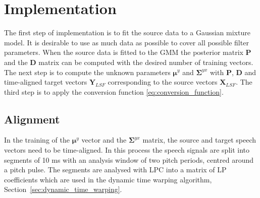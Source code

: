 \chapter{Implementation} %
\label{cha:implementation}
The first step of implementation is to fit the source data to a Gaussian mixture model. It is desirable to use as much data as possible to cover all possible filter parameters. When the source data is fitted to the GMM the posterior matrix $\mathbf{P}$ and the $\mathbf{D}$ matrix can be computed with the desired number of training vectors. The next step is to compute the unknown parameters $\boldsymbol{\mu}^y$ and $\mathbf{\Sigma}^{yx}$ with $\mathbf{P}$, $\mathbf{D}$ and time-aligned target vectors $\mathbf{Y}_{LSF}$ corresponding to the source vectors $\mathbf{X}_{LSF}$. The third step is to apply the conversion function \eqref{eq:conversion_function}.


\section{Alignment} %
\label{sec:alignment}
In the training of the $\boldsymbol{\mu}^y$ vector and the $\mathbf{\Sigma}^{yx}$ matrix, the source and target speech vectors need to be time-aligned. In this process the speech signals are split into segments of 10 ms with an analysis window of two pitch periods, centred around a pitch pulse. The segments are analysed with LPC into a matrix of LP coefficients which are used in the dynamic time warping algorithm, Section~\ref{sec:dynamic_time_warping}.

